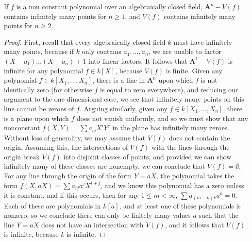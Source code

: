 \begin{prop}
    If $f$ is a non constant polynomial over an algebraically closed field, $\mathbf{A}^n - V(f)$ contains infinitely many points for $n \geq 1$, and $V(f)$ contains infinitely many points for $n \geq 2$.
\end{prop}
\begin{proof}
    First, recall that every algebraically closed field $k$ must have infinitely many points, because if $k$ only contains $a_1, \dots, a_n$, we are unable to factor $(X - a_1) \dots (X - a_n) + 1$ into linear factors. It follows that $\mathbf{A}^1 - V(f)$ is infinite for any polynomial $f \in k[X]$, because $V(f)$ is finite. Given any polynomial $f \in k[X_1, \dots, X_n]$, there is a line in $\mathbf{A}^n$ upon which $f$ is not identically zero (for otherwise $f$ is equal to zero everywhere), and reducing our argument to the one dimensional case, we see that infinitely many points on this line cannot be zeroes of $f$. Arguing similarly, given any $f \in k[X_1, \dots, X_n]$, there is a plane upon which $f$ does not vanish uniformly, and so we must show that any nonconstant $f(X,Y) = \sum a_{ij} X^i Y^j$ in the plane has infinitely many zeroes. Without loss of generality, we may assume that $V(f)$ does not contain the origin. Assuming this, the intersections of $V(f)$ with the lines through the origin break $V(f)$ into disjoint classes of points, and provided we can show infinitely many of these classes are nonempty, we can conclude that $V(f) = \emptyset$. For any line through the origin of the form $Y = aX$, the polynomial takes the form $f(X,aX) = \sum a_{ij} a^j X^{i+j}$, and we know this polynomial has a zero unless it is constant, and if this occurs, then for any $1 \leq m < \infty$, $\sum a_{(m-k)k} a^k = 0$. Each of these are polynomials in $k[a]$, and at least one of these polynomials is nonzero, so we conclude there can only be finitely many values $a$ such that the line $Y = aX$ does not have an intersection with $V(f)$, and it follows that $V(f)$ is infinite, because $k$ is infinite.
\end{proof}

